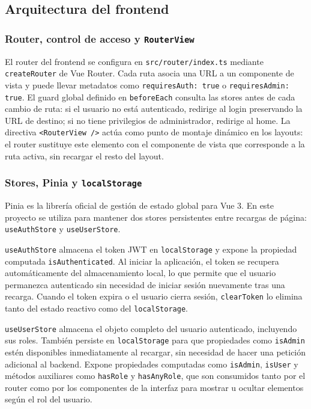 \subsection{Arquitectura del frontend}

\subsubsection*{Router, control de acceso y \texttt{RouterView}}

El router del frontend se configura en \texttt{src/router/index.ts} mediante 
\texttt{createRouter} de Vue Router. Cada ruta asocia una URL a un componente de 
vista y puede llevar metadatos como \texttt{requiresAuth: true} o 
\texttt{requiresAdmin: true}. El guard global definido en \texttt{beforeEach} 
consulta las stores antes de cada cambio de ruta: si el usuario no está autenticado, 
redirige al login preservando la URL de destino; si no tiene privilegios de 
administrador, redirige al home. La directiva \texttt{<RouterView />} actúa como 
punto de montaje dinámico en los layouts: el router sustituye este elemento con el 
componente de vista que corresponde a la ruta activa, sin recargar el resto del 
layout.

\subsubsection*{Stores, Pinia y \texttt{localStorage}}

Pinia es la librería oficial de gestión de estado global para Vue 3. En este proyecto 
se utiliza para mantener dos stores persistentes entre recargas de página: 
\texttt{useAuthStore} y \texttt{useUserStore}.

\texttt{useAuthStore} almacena el token JWT en \texttt{localStorage} y expone la 
propiedad computada \texttt{isAuthenticated}. Al iniciar la aplicación, el token se 
recupera automáticamente del almacenamiento local, lo que permite que el usuario 
permanezca autenticado sin necesidad de iniciar sesión nuevamente tras una recarga. 
Cuando el token expira o el usuario cierra sesión, \texttt{clearToken} lo elimina 
tanto del estado reactivo como del \texttt{localStorage}.

\texttt{useUserStore} almacena el objeto completo del usuario autenticado, incluyendo 
sus roles. También persiste en \texttt{localStorage} para que propiedades como 
\texttt{isAdmin} estén disponibles inmediatamente al recargar, sin necesidad de hacer 
una petición adicional al backend. Expone propiedades computadas como \texttt{isAdmin}, 
\texttt{isUser} y métodos auxiliares como \texttt{hasRole} y \texttt{hasAnyRole}, 
que son consumidos tanto por el router como por los componentes de la interfaz para 
mostrar u ocultar elementos según el rol del usuario.

